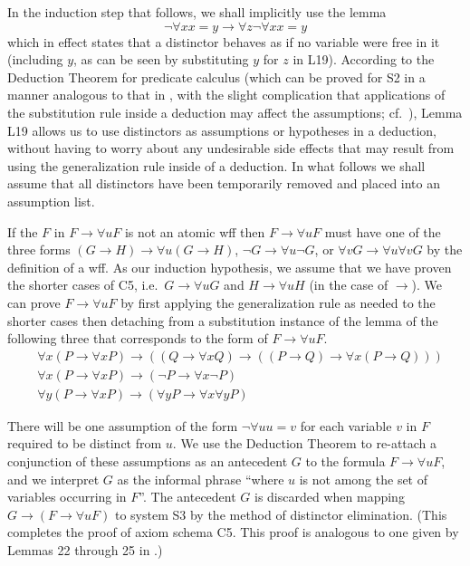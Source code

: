 \documentclass[leqno]{article}
\begin{document}
     In the induction step that follows, we shall implicitly use the lemma
\begin{equation} %
   \lnot \forall xx=y\rightarrow \forall z\lnot \forall xx=y
\end{equation}
which in effect states that a distinctor behaves as if no variable were free
in it (including $y$, as can be seen by substituting $y$ for $z$ in L19).
According to the Deduction Theorem for predicate calculus (which can be proved
for S2 in a manner analogous to that in \cite[p.\ 77]{Hamilton}, with the
slight complication that  applications of the substitution rule inside a
deduction may affect the assumptions; cf.\ \cite[p.\ 140]{Kleene}), Lemma L19
allows us to use distinctors as assumptions or hypotheses in a deduction,
without having to worry about any undesirable side effects that may result
from using the generalization rule inside of a deduction.  In what follows we
shall assume that all distinctors have been temporarily removed and placed
into an assumption list.

     If the $F$ in $F\rightarrow \forall uF$ is not an atomic wff then
$F\rightarrow \forall uF$ must have one of the three forms $(G\rightarrow
H)\rightarrow \forall u(G\rightarrow H)$, $\lnot G\rightarrow \forall u\lnot
G$, or $\forall vG\rightarrow \forall u\forall vG$ by the definition of a wff.
As our induction hypothesis, we assume that we have proven the shorter cases
of C5, i.e.\ $G\rightarrow \forall uG$ and $H\rightarrow \forall uH$ (in the
case of $\rightarrow$).  We can prove $F\rightarrow \forall uF$ by first
applying the generalization rule as needed to the shorter cases then
detaching from a substitution instance of the lemma of the following three
that corresponds to the form of $F\rightarrow \forall uF$.
\begin{eqnarray} %
  & \forall x(P\rightarrow \forall xP)\rightarrow ((Q\rightarrow \forall
xQ)\rightarrow ((P\rightarrow Q)\rightarrow \forall x(P\rightarrow Q))) \\
  & \forall x(P\rightarrow \forall xP)\rightarrow (\lnot P\rightarrow
\forall x\lnot P) \\
  & \forall y(P\rightarrow \forall xP)\rightarrow (\forall yP\rightarrow
\forall x\forall yP)
\end{eqnarray}

     There will be one assumption of the form $\lnot \forall uu=v$ for each
variable $v$ in $F$ required to be distinct from $u$.  We use the Deduction
Theorem to re-attach a conjunction of these assumptions as an antecedent $G$
to the formula $F\rightarrow \forall uF$, and we interpret $G$ as the informal
phrase ``where $u$ is not among the set of variables occurring in $F$''.  The
antecedent $G$ is discarded when mapping $G\rightarrow (F\rightarrow \forall
uF)$ to system S3 by the method of distinctor elimination.  (This completes
the proof of axiom schema C5.  This proof is analogous to one given by Lemmas
22 through 25 in \cite{MonkS}.)
\end{document}
